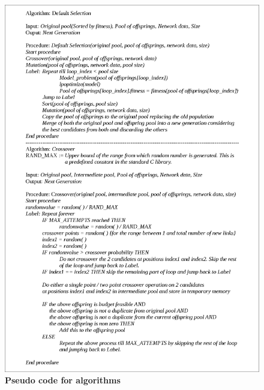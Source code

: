 \documentclass[a4paper, 12pt]{article}
\begin{document}
\begin{figure}[htbp]
\hspace*{-0.10in}
\includegraphics[scale=0.60]{./diagram2.eps}
\caption{\textbf{Pseudo code for algorithms}}
\label{fig 3}
\end{figure}
\clearpage
\clearpage
\end{document}
